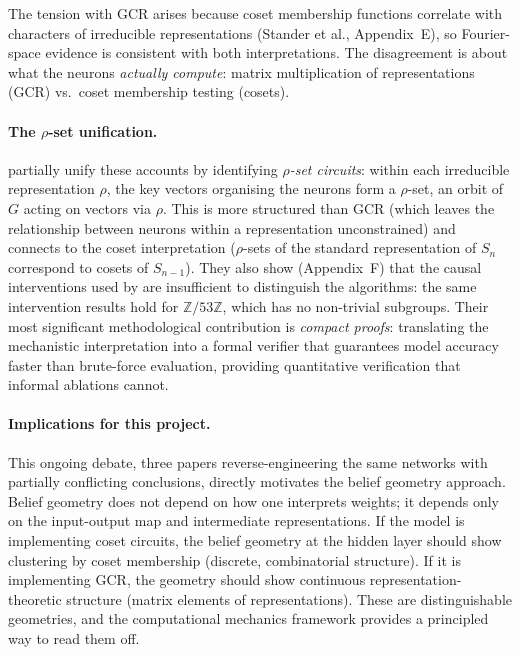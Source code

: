 \documentclass[11pt,a4paper]{article}
\begin{document}
The tension with GCR arises because coset membership functions correlate with characters of irreducible representations (Stander et al., Appendix~E), so Fourier-space evidence is consistent with both interpretations. The disagreement is about what the neurons \emph{actually compute}: matrix multiplication of representations (GCR) vs.\ coset membership testing (cosets).

\paragraph{The $\rho$-set unification.} \citet{wu2024unified} partially unify these accounts by identifying \emph{$\rho$-set circuits}: within each irreducible representation $\rho$, the key vectors organising the neurons form a $\rho$-set, an orbit of $G$ acting on vectors via $\rho$. This is more structured than GCR (which leaves the relationship between neurons within a representation unconstrained) and connects to the coset interpretation ($\rho$-sets of the standard representation of $S_n$ correspond to cosets of $S_{n-1}$). They also show (Appendix~F) that the causal interventions used by \citet{stander2024grokking} are insufficient to distinguish the algorithms: the same intervention results hold for $\mathbb{Z}/53\mathbb{Z}$, which has no non-trivial subgroups. Their most significant methodological contribution is \emph{compact proofs}: translating the mechanistic interpretation into a formal verifier that guarantees model accuracy faster than brute-force evaluation, providing quantitative verification that informal ablations cannot.

\paragraph{Implications for this project.} This ongoing debate, three papers reverse-engineering the same networks with partially conflicting conclusions, directly motivates the belief geometry approach. Belief geometry does not depend on how one interprets weights; it depends only on the input-output map and intermediate representations. If the model is implementing coset circuits, the belief geometry at the hidden layer should show clustering by coset membership (discrete, combinatorial structure). If it is implementing GCR, the geometry should show continuous representation-theoretic structure (matrix elements of representations). These are distinguishable geometries, and the computational mechanics framework provides a principled way to read them off.
\end{document}
